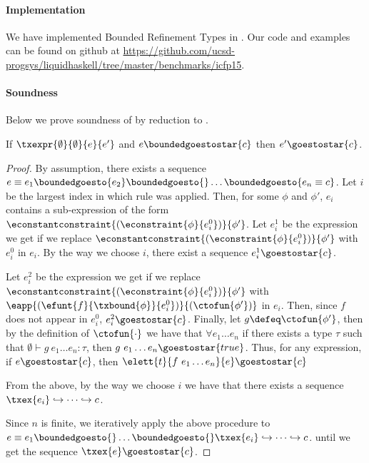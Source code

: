 \paragraph{Implementation}
We have implemented Bounded Refinement Types in \toolname.
Our code and examples can be found on github at 
\url{https://github.com/ucsd-progsys/liquidhaskell/tree/master/benchmarks/icfp15}.

\paragraph{Soundness} 
Below we prove soundness of \boundedcorelan by reduction to \corelan.

\begin{theorem*}
\label{theorem:operational}
If $\txexpr{\emptyset}{\emptyset}{e}{e'}$ and
   $e \boundedgoestostar{c}$ 
then $e' \goestostar{c}$.
\end{theorem*}

\begin{proof}
By assumption, there exists a sequence 
$e \equiv e_1 \boundedgoesto{e_2} \boundedgoesto{} \dots
\boundedgoesto{e_n\equiv c} $.
%
Let $i$ be the largest index in which rule \rtobound was applied.
%
Then, for some $\phi$ and $\phi'$, 
$e_i$ contains a sub-expression of the form 
$\econstantconstraint{(\econstraint{\phi}{e_i^0})}{\phi'}$.
%
Let $e_i^1$ be the expression we get if we replace 
$\econstantconstraint{(\econstraint{\phi}{e_i^0})}{\phi'}$
with $e_i^0$ in $e_i$.
%
By the way we choose $i$, there exist a sequence 
$e_i^1 \goestostar{c}$.

Let $e_i^2$
be the expression we get if we replace 
$\econstantconstraint{(\econstraint{\phi}{e_i^0})}{\phi'}$
with $\eapp{(\efunt{f}{\txbound{\phi}}{e_i^0})}{(\ctofun{\phi'})}$ in $e_i$.
%
Then, since $f$ does not appear in $e_i^0$,
$e_i^2 \goestostar{c}$.
%
Finally, 
let $g \defeq \ctofun{\phi'}$, then
by the definition of 
$\ctofun{\cdot}$
we have that  $\forall e_1 \dots e_n$ 
if 
there exists a type $\tau$ such that
$\emptyset \vdash g \ e_1 \dots e_n : \tau $,
then $g \ e_1 \dots e_n \goestostar{true}$.
%
Thus, for any expression, 
if $e \goestostar{c}$, then $\elett{t}{f \ e_1 \dots e_n}{e}\goestostar{c}$

From the above, by the way we choose $i$ we have that 
there exists a sequence 
%
$\txex{e_i} \hookrightarrow \dots \hookrightarrow {c}$.

Since $n$ is finite, we iteratively apply the above procedure to 
$e \equiv e_1\boundedgoesto{} \dots \boundedgoesto{} \txex{e_i}\hookrightarrow \dots \hookrightarrow {c}$.
until we get the sequence $ {\txex{e}}\goestostar{c}$.
\end{proof}

